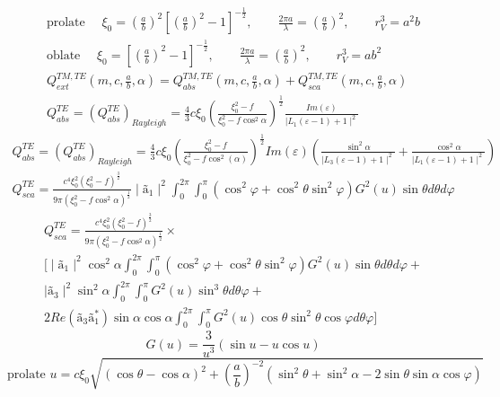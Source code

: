 \documentclass[a4paper,10pt]{article}
\begin{document}
\begin{align}
 \text{prolate  }\quad  \xi_0 = \left(\frac{a}{b}\right)^2\left[\left(\frac{a}{b}\right)^2-1\right]^{-\frac{1}{2}}, 
		 \qquad  \frac{2\pi a}{\lambda} = \left(\frac{a}{b}\right)^2,
		 \qquad  r^3_V = a^2b \\
 \text{oblate  } \quad  \xi_0 = \left[\left(\frac{a}{b}\right)^2-1\right]^{-\frac{1}{2}}, 
		 \qquad  \frac{2\pi a}{\lambda} = \left(\frac{a}{b}\right)^2, 
		 \qquad  r^3_V = ab^2 \\
Q_{ext}^{TM,TE}\left(m,c,\frac{a}{b},\alpha\right) = Q_{abs}^{TM,TE}\left(m,c,\frac{a}{b},\alpha\right)+ Q_{sca}^{TM,TE}\left(m,c,\frac{a}{b},\alpha\right)\\
Q^{TE}_{abs} = \left(Q^{TE}_{abs}\right)_{Rayleigh} = \frac{4}{3}c\xi_0\left(\frac{\xi_0^2-f}{\xi_0^2-f\cos^2\alpha}\right)^\frac{1}{2}\frac{Im(\varepsilon)}{\mid L_1(\varepsilon-1)+1\mid^2}
\end{align}
\begin{align}
Q^{TE}_{abs} = \left(Q^{TE}_{abs}\right)_{Rayleigh} = \frac{4}{3}c\xi_0\left(\frac{\xi_0^2-f}{\xi_0^2-f\cos^2(\alpha)}\right)^\frac{1}{2}Im(\varepsilon)
\left(\frac{\sin^2\alpha}{\mid L_3(\varepsilon-1)+1\mid^2}+\frac{\cos^2\alpha}{\mid L_1(\varepsilon-1)+1\mid^2}\right)
\end{align}
\begin{align}
Q^{TE}_{sca} = \frac{c^4\xi_0^2(\xi_0^2-f)^\frac{3}{2}}{9\pi(\xi_0^2-f\cos^2\alpha)^\frac{1}{2}}\mid\text{\~{a}}_1\mid^2
	      \int^{2\pi}_0\int^{\pi}_0(\cos^2\varphi+\cos^2\theta\sin^2\varphi)G^2(u)\sin\theta d\theta d\varphi
\end{align}
\begin{eqnarray}
 Q^{TE}_{sca} = \frac{c^4\xi_0^2(\xi_0^2-f)^\frac{3}{2}}{9\pi(\xi_0^2-f\cos^2\alpha)^\frac{1}{2}}\times\nonumber\\
 \bigg[\mid\text{\~{a}}_1\mid^2\cos^2\alpha\int^{2\pi}_0\int^{\pi}_0(\cos^2\varphi+\cos^2\theta\sin^2\varphi)G^2(u)\sin\theta d\theta d\varphi+\nonumber\\
 \mid\text{\~{a}}_3\mid^2\sin^2\alpha\int^{2\pi}_0\int^{\pi}_0 G^2(u)\sin^3\theta d\theta \varphi+\nonumber\\
  2Re(\text{\~{a}}_3\text{\~{a}}_1^*)\sin\alpha\cos\alpha\int^{2\pi}_0\int^{\pi}_0 G^2(u)\cos\theta\sin^2\theta\cos\varphi d\theta \varphi\bigg]
\end{eqnarray}
\newpage
\begin{equation}
  G(u) = \frac{3}{u^3}(\sin u- u \cos u)
\end{equation}
\begin{equation}
  \text{prolate    } u=c\xi_0\sqrt{(\cos\theta-\cos\alpha)^2+\left(\frac{a}{b}\right)^{-2}(\sin^2\theta+\sin^2\alpha-2\sin\theta\sin\alpha\cos\varphi)} 
\end{equation}
\end{document}
